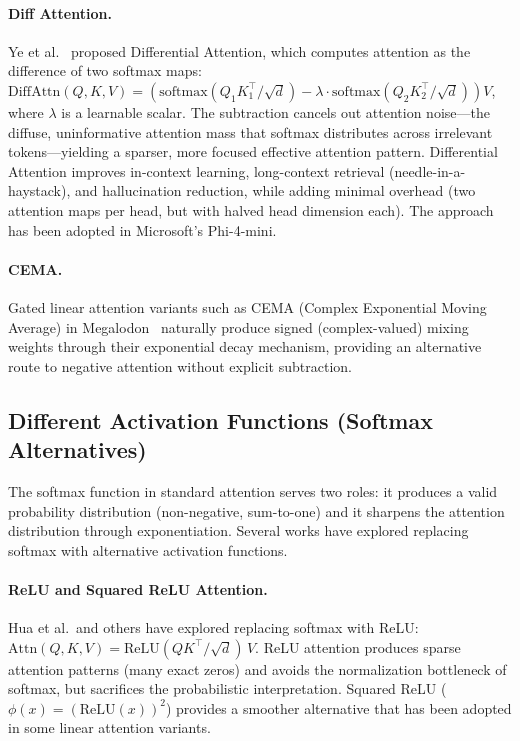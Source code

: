 \paragraph{Diff Attention.}
Ye et al.~\cite{ye2024differential} proposed Differential Attention, which computes attention as the difference of two softmax maps: $\text{DiffAttn}(Q, K, V) = (\text{softmax}(Q_1 K_1^\top / \sqrt{d}) - \lambda \cdot \text{softmax}(Q_2 K_2^\top / \sqrt{d})) V$, where $\lambda$ is a learnable scalar. The subtraction cancels out attention noise---the diffuse, uninformative attention mass that softmax distributes across irrelevant tokens---yielding a sparser, more focused effective attention pattern. Differential Attention improves in-context learning, long-context retrieval (needle-in-a-haystack), and hallucination reduction, while adding minimal overhead (two attention maps per head, but with halved head dimension each). The approach has been adopted in Microsoft's Phi-4-mini.

\paragraph{CEMA.}
Gated linear attention variants such as CEMA (Complex Exponential Moving Average) in Megalodon~\cite{ma2024megalodon} naturally produce signed (complex-valued) mixing weights through their exponential decay mechanism, providing an alternative route to negative attention without explicit subtraction.

\subsection{Different Activation Functions (Softmax Alternatives)}
\label{subsec:softmax-alt}

The softmax function in standard attention serves two roles: it produces a valid probability distribution (non-negative, sum-to-one) and it sharpens the attention distribution through exponentiation. Several works have explored replacing softmax with alternative activation functions.

\paragraph{ReLU and Squared ReLU Attention.}
Hua et al.\ and others have explored replacing softmax with ReLU: $\text{Attn}(Q, K, V) = \text{ReLU}(QK^\top / \sqrt{d})\, V$. ReLU attention produces sparse attention patterns (many exact zeros) and avoids the normalization bottleneck of softmax, but sacrifices the probabilistic interpretation. Squared ReLU ($\phi(x) = (\text{ReLU}(x))^2$) provides a smoother alternative that has been adopted in some linear attention variants.

